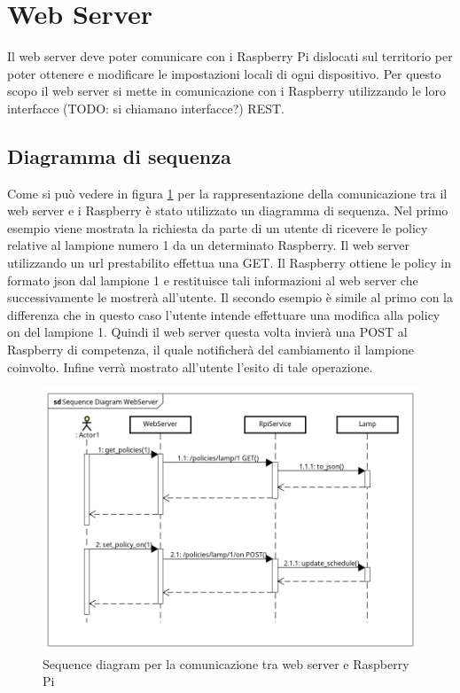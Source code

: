 \section{Web Server}
Il web server deve poter comunicare con i Raspberry Pi dislocati sul territorio per poter ottenere e modificare le impostazioni locali di ogni dispositivo.
Per questo scopo il web server si mette in comunicazione con i Raspberry utilizzando le loro interfacce (TODO: si chiamano interfacce?) REST.

\subsection{Diagramma di sequenza}
Come si può vedere in figura \ref{SD WEB} per la rappresentazione della comunicazione tra il web server e i Raspberry è stato utilizzato un diagramma di sequenza.
Nel primo esempio viene mostrata la richiesta da parte di un utente di ricevere le policy relative al lampione numero 1 da un determinato Raspberry.
Il web server utilizzando un url prestabilito effettua una GET. Il Raspberry ottiene le policy in formato json dal lampione 1 e restituisce tali informazioni al web server che successivamente le mostrerà all'utente.
Il secondo esempio è simile al primo con la differenza che in questo caso l'utente intende effettuare una modifica alla policy on del lampione 1. Quindi il web server questa volta invierà una POST al Raspberry di competenza, il quale notificherà del cambiamento il lampione coinvolto. Infine verrà mostrato all'utente l'esito di tale operazione.

\begin{figure}[tbp]
	\centering
	\includegraphics[scale=.55]{figure/Sequence_Diagram_WebServer.png}
	\caption{Sequence diagram per la comunicazione tra web server e Raspberry Pi \label{SD WEB}}
\end{figure}

